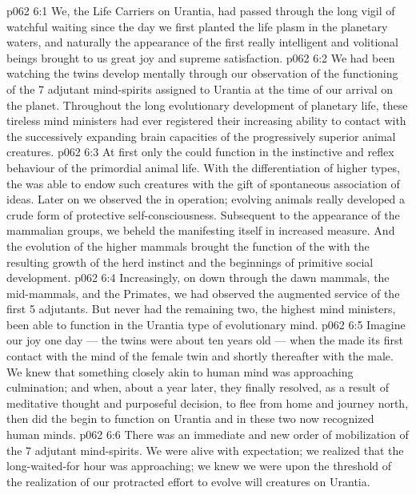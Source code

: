 \vs p062 6:1 We, the Life Carriers on Urantia, had passed through the long vigil of watchful waiting since the day we first planted the life plasm in the planetary waters, and naturally the appearance of the first really intelligent and volitional beings brought to us great joy and supreme satisfaction.
\vs p062 6:2 We had been watching the twins develop mentally through our observation of the functioning of the 7 adjutant mind\hyp{}spirits assigned to Urantia at the time of our arrival on the planet. Throughout the long evolutionary development of planetary life, these tireless mind ministers had ever registered their increasing ability to contact with the successively expanding brain capacities of the progressively superior animal creatures.
\vs p062 6:3 At first only the  could function in the instinctive and reflex behaviour of the primordial animal life. With the differentiation of higher types, the  was able to endow such creatures with the gift of spontaneous association of ideas. Later on we observed the  in operation; evolving animals really developed a crude form of protective self\hyp{}consciousness. Subsequent to the appearance of the mammalian groups, we beheld the  manifesting itself in increased measure. And the evolution of the higher mammals brought the function of the  with the resulting growth of the herd instinct and the beginnings of primitive social development.
\vs p062 6:4 Increasingly, on down through the dawn mammals, the mid\hyp{}mammals, and the Primates, we had observed the augmented service of the first 5 adjutants. But never had the remaining two, the highest mind ministers, been able to function in the Urantia type of evolutionary mind.
\vs p062 6:5 Imagine our joy one day --- the twins were about ten years old --- when the  made its first contact with the mind of the female twin and shortly thereafter with the male. We knew that something closely akin to human mind was approaching culmination; and when, about a year later, they finally resolved, as a result of meditative thought and purposeful decision, to flee from home and journey north, then did the  begin to function on Urantia and in these two now recognized human minds.
\vs p062 6:6 There was an immediate and new order of mobilization of the 7 adjutant mind\hyp{}spirits. We were alive with expectation; we realized that the long\hyp{}waited\hyp{}for hour was approaching; we knew we were upon the threshold of the realization of our protracted effort to evolve will creatures on Urantia.
